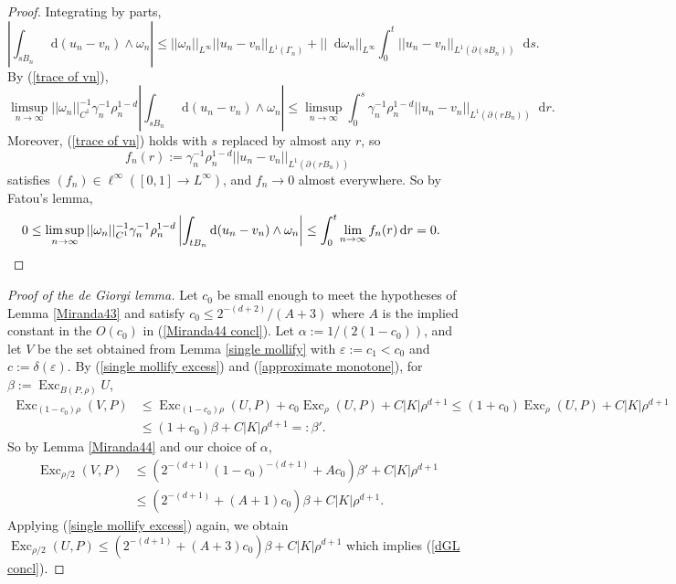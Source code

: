 \documentclass[reqno,11pt]{amsart}
\DeclareMathOperator{\Exc}{Exc}
\newcommand*\dif{\mathop{}\!\mathrm{d}}
\theoremstyle{definition}
\numberwithin{equation}{section}
\begin{document}
\begin{proof}
Integrating by parts,
$$\left|\int_{sB_n} \dif (u_n - v_n) \wedge \omega_n\right| \leq ||\omega_n||_{L^\infty} ||u_n - v_n||_{L^1(\Gamma_n)} + ||\dif \omega_n||_{L^\infty} \int_0^t ||u_n - v_n||_{L^1(\partial(sB_n))} \dif s.$$
By (\ref{trace of vn}),
$$\limsup_{n \to \infty} ||\omega_n||_{C^1}^{-1} \gamma_n^{-1} \rho_n^{1 - d} \left|\int_{sB_n} \dif(u_n - v_n) \wedge \omega_n\right| \leq \limsup_{n \to \infty} \int_0^s \gamma_n^{-1} \rho_n^{1 - d} ||u_n - v_n||_{L^1(\partial(rB_n))} \dif r.$$
Moreover, (\ref{trace of vn}) holds with $s$ replaced by almost any $r$, so
$$f_n(r) := \gamma_n^{-1} \rho_n^{1 - d} ||u_n - v_n||_{L^1(\partial(rB_n))}$$
satisfies $(f_n) \in \ell^\infty([0, 1] \to L^\infty)$, and $f_n \to 0$ almost everywhere.
So by Fatou's lemma,
\begin{align*}
0 \leq \limsup_{n \to \infty} ||\omega_n||_{C^1}^{-1} \gamma_n^{-1} \rho_n^{1 - d} \left|\int_{tB_n} \dif(u_n - v_n) \wedge \omega_n\right| &\leq \int_0^t \lim_{n \to \infty} f_n(r) \dif r = 0. \qedhere
\end{align*}
\end{proof}

\begin{proof}[Proof of the de Giorgi lemma]
Let $c_0$ be small enough to meet the hypotheses of Lemma \ref{Miranda43} and satisfy $c_0 \leq 2^{-(d + 2)}/(A + 3)$ where $A$ is the implied constant in the $O(c_0)$ in (\ref{Miranda44 concl}).
Let $\alpha := 1/(2(1 - c_0))$, and let $V$ be the set obtained from Lemma \ref{single mollify} with $\varepsilon := c_1 < c_0$ and $c := \delta(\varepsilon)$.
By (\ref{single mollify excess}) and (\ref{approximate monotone}), for $\beta := \Exc_{B(P, \rho)} U$,
\begin{align*}
\Exc_{(1 - c_0) \rho} (V, P) &\leq \Exc_{(1 - c_0) \rho} (U, P) + c_0 \Exc_\rho (U, P) + C|K| \rho^{d + 1} \leq (1 + c_0) \Exc_\rho (U, P) + C |K| \rho^{d + 1} \\
&\leq (1 + c_0) \beta + C |K| \rho^{d + 1} =: \beta'.
\end{align*}
So by Lemma \ref{Miranda44} and our choice of $\alpha$,
\begin{align*}
\Exc_{\rho/2} (V, P) &\leq (2^{-(d + 1)} (1 - c_0)^{-(d + 1)} + Ac_0) \beta' + C |K| \rho^{d + 1} \\
&\leq (2^{-(d + 1)} + (A + 1) c_0) \beta + C |K| \rho^{d + 1}.
\end{align*}
Applying (\ref{single mollify excess}) again, we obtain $\Exc_{\rho/2} (U, P) \leq (2^{-(d + 1)} + (A + 3) c_0) \beta + C |K| \rho^{d +1}$ which implies (\ref{dGL concl}).
\end{proof}
\end{document}
